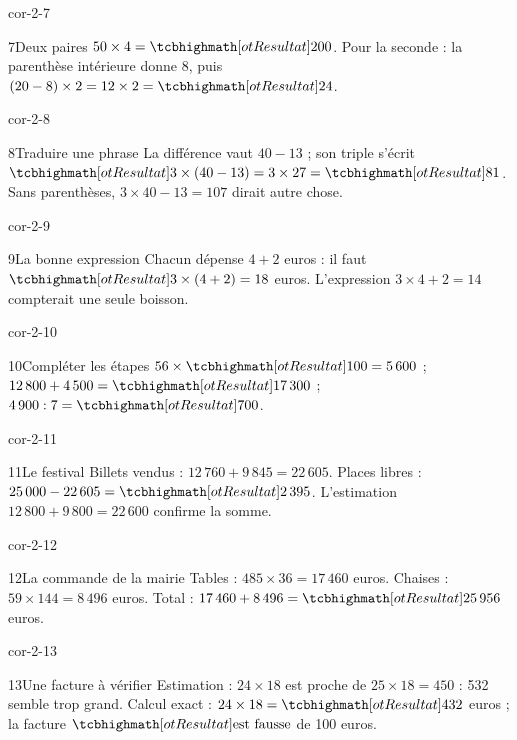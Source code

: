 \begin{blocLivre}{cor-2-7}\begin{corrige}{7}{Deux paires}
$50\times4=\res{200}$. Pour la seconde : la parenthèse intérieure donne 8, puis $(20-8)\times2=12\times2=\res{24}$.
\end{corrige}\end{blocLivre}
\begin{blocLivre}{cor-2-8}\begin{corrige}{8}{Traduire une phrase}
La différence vaut $40-13$ ; son triple s’écrit $\res{3\times(40-13)}=3\times27=\res{81}$. Sans parenthèses, $3\times40-13=107$ dirait autre chose.
\end{corrige}\end{blocLivre}
\begin{blocLivre}{cor-2-9}\begin{corrige}{9}{La bonne expression}
Chacun dépense $4+2$ euros : il faut $\res{3\times(4+2)}=18$ euros. L’expression $3\times4+2=14$ compterait une seule boisson.
\end{corrige}\end{blocLivre}
\begin{blocLivre}{cor-2-10}\begin{corrige}{10}{Compléter les étapes}
$56\times\res{100}=5\,600$ ; $12\,800+4\,500=\res{17\,300}$ ; $4\,900:7=\res{700}$.
\end{corrige}\end{blocLivre}
\begin{blocLivre}{cor-2-11}\begin{corrige}{11}{Le festival}
Billets vendus : $12\,760+9\,845=22\,605$. Places libres : $25\,000-22\,605=\res{2\,395}$. L’estimation $12\,800+9\,800=22\,600$ confirme la somme.
\end{corrige}\end{blocLivre}
\begin{blocLivre}{cor-2-12}\begin{corrige}{12}{La commande de la mairie}
Tables : $485\times36=17\,460$ euros. Chaises : $59\times144=8\,496$ euros. Total : $17\,460+8\,496=\res{25\,956}$ euros.
\end{corrige}\end{blocLivre}
\begin{blocLivre}{cor-2-13}\begin{corrige}{13}{Une facture à vérifier}
Estimation : $24\times18$ est proche de $25\times18=450$ : 532 semble trop grand. Calcul exact : $24\times18=\res{432}$ euros ; la facture $\res{\text{est fausse}}$ de 100 euros.
\end{corrige}\end{blocLivre}

